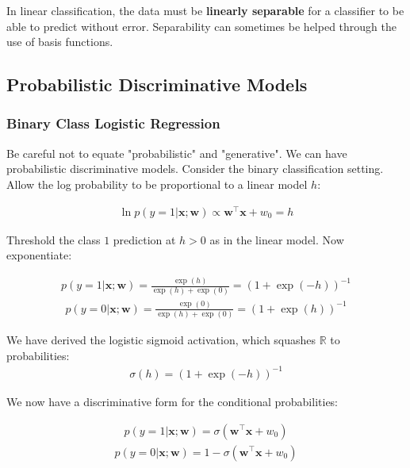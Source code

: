 \documentclass[12pt,letterpaper]{article}
\newcommand{\1}{\mathbbm{1}}
\begin{document}
\noindent 
In linear classification, the data must be \textbf{linearly separable} for a classifier to be able to predict without error. Separability can sometimes be helped through the use of basis functions.\\

\subsection{Probabilistic Discriminative Models}

\subsubsection{Binary Class Logistic Regression}

\noindent
Be careful not to equate "probabilistic" and "generative". We can have probabilistic discriminative models. Consider the binary classification setting. Allow the log probability to be proportional to a linear model $h$:

\begin{align}
    \ln p(y = 1 | \mathbf{x};\mathbf{w}) \propto \mathbf{w}^\top\mathbf{x} + w_0 = h
\end{align}

\noindent
Threshold the class $1$ prediction at $h > 0$ as in the linear model. Now exponentiate:

\begin{align}
  p(y = 1 | \mathbf{x};\mathbf{w}) = \frac{\exp(h)}{\exp(h)+\exp(0)} = (1 + \exp(-h))^{-1} 
\end{align}
\begin{align}
   p(y = 0 | \mathbf{x};\mathbf{w}) = \frac{\exp(0)}{\exp(h)+\exp(0)} = (1 + \exp(h))^{-1} 
\end{align}




\noindent 
We have derived the logistic sigmoid activation, which squashes $\mathbb{R}$ to probabilities:
\begin{align}
    \sigma(h) = (1 + \exp(-h))^{-1}
\end{align}

\noindent
We now have a discriminative form for the conditional probabilities:

\begin{align}
   p(y = 1 | \mathbf{x};\mathbf{w}) = \sigma(\mathbf{w}^\top\mathbf{x} + w_0) 
\end{align}
\begin{align}
   p(y = 0 | \mathbf{x};\mathbf{w}) = 1 - \sigma(\mathbf{w}^\top\mathbf{x} + w_0) 
\end{align}
\end{document}
